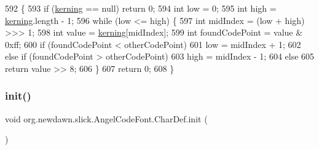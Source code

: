 \begin{DoxyCode}
592                                                    \{
593             \textcolor{keywordflow}{if} (\mbox{\hyperlink{classorg_1_1newdawn_1_1slick_1_1_angel_code_font_1_1_char_def_a8eea71c0865ccf322a262f877cf4245b}{kerning}} == null) \textcolor{keywordflow}{return} 0;
594             \textcolor{keywordtype}{int} low = 0;
595             \textcolor{keywordtype}{int} high = \mbox{\hyperlink{classorg_1_1newdawn_1_1slick_1_1_angel_code_font_1_1_char_def_a8eea71c0865ccf322a262f877cf4245b}{kerning}}.length - 1;
596             \textcolor{keywordflow}{while} (low <= high) \{
597                 \textcolor{keywordtype}{int} midIndex = (low + high) >>> 1;
598                 \textcolor{keywordtype}{int} value = \mbox{\hyperlink{classorg_1_1newdawn_1_1slick_1_1_angel_code_font_1_1_char_def_a8eea71c0865ccf322a262f877cf4245b}{kerning}}[midIndex];
599                 \textcolor{keywordtype}{int} foundCodePoint = value & 0xff;
600                 \textcolor{keywordflow}{if} (foundCodePoint < otherCodePoint)
601                     low = midIndex + 1;
602                 \textcolor{keywordflow}{else} \textcolor{keywordflow}{if} (foundCodePoint > otherCodePoint)
603                     high = midIndex - 1;
604                 \textcolor{keywordflow}{else} 
605                     \textcolor{keywordflow}{return} value >> 8;
606             \}
607             \textcolor{keywordflow}{return} 0;
608         \}
\end{DoxyCode}
\mbox{\label{classorg_1_1newdawn_1_1slick_1_1_angel_code_font_1_1_char_def_a3ea6d6d64220a293e70a14d90151f359}} 
\subsubsection{\texorpdfstring{init()}{init()}}
{\footnotesize\ttfamily void org.\+newdawn.\+slick.\+Angel\+Code\+Font.\+Char\+Def.\+init (\begin{DoxyParamCaption}{ }\end{DoxyParamCaption})\hspace{0.3cm}{\ttfamily [inline]}}

